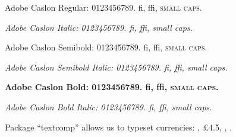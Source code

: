 \documentclass{article}
\begin{document}
Adobe Caslon Regular: 0123456789. fi, ffi, \textsc{small caps}. \lipsum[1]

{\itshape Adobe Caslon Italic: 0123456789. fi, ffi, {\scit small caps}. \lipsum[2]}


{\sbseries
Adobe Caslon Semibold: 0123456789. fi, ffi, \textsc{small caps}. \lipsum[3]

\itshape Adobe Caslon Semibold Italic: 0123456789. fi, ffi, {\scit small caps}. \lipsum[4]}


{\bfseries
Adobe Caslon Bold: 0123456789. fi, ffi, \textsc{small caps}. \lipsum[5]

\itshape Adobe Caslon Bold Italic: 0123456789. fi, ffi, {\scit small caps}. \lipsum[6]}


Package ``textcomp'' allows us to typeset currencies: ,
\pounds4.5, , .
\end{document}
